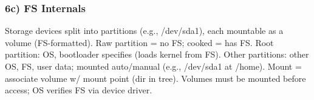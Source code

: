 \subsubsection*{6c) FS Internals}
Storage devices split into partitions (e.g., /dev/sda1), each mountable as a volume (FS-formatted). Raw partition = no FS; cooked = has FS. Root partition: OS, bootloader specifies (loads kernel from FS). Other partitions: other OS, FS, user data; mounted auto/manual (e.g., /dev/sda1 at /home).  
Mount = associate volume w/ mount point (dir in tree). Volumes must be mounted before access; OS verifies FS via device driver.
